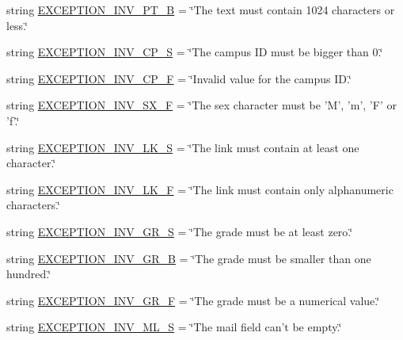 \begin{DoxyCompactItemize}
\item 
string \hyperlink{namespaceELO_1_1lang_1_1en__us_a7b395973b5cd7ee9115746fb78e90832}{E\-X\-C\-E\-P\-T\-I\-O\-N\-\_\-\-I\-N\-V\-\_\-\-P\-T\-\_\-\-B} = \char`\"{}The text must contain 1024 characters or less.\char`\"{}
\item 
string \hyperlink{namespaceELO_1_1lang_1_1en__us_a9f3bc4edb7cf8b2a8a8e69dba7107c89}{E\-X\-C\-E\-P\-T\-I\-O\-N\-\_\-\-I\-N\-V\-\_\-\-C\-P\-\_\-\-S} = \char`\"{}The campus I\-D must be bigger than 0.\char`\"{}
\item 
string \hyperlink{namespaceELO_1_1lang_1_1en__us_afefa8b55d7fbe71a4763059b598e6274}{E\-X\-C\-E\-P\-T\-I\-O\-N\-\_\-\-I\-N\-V\-\_\-\-C\-P\-\_\-\-F} = \char`\"{}Invalid value for the campus I\-D.\char`\"{}
\item 
string \hyperlink{namespaceELO_1_1lang_1_1en__us_a5e7c07eb4437cdc43592aeb52133497f}{E\-X\-C\-E\-P\-T\-I\-O\-N\-\_\-\-I\-N\-V\-\_\-\-S\-X\-\_\-\-F} = \char`\"{}The sex character must be 'M', 'm', 'F' or 'f'.\char`\"{}
\item 
string \hyperlink{namespaceELO_1_1lang_1_1en__us_a00dd434b73828d998899c7646396b73a}{E\-X\-C\-E\-P\-T\-I\-O\-N\-\_\-\-I\-N\-V\-\_\-\-L\-K\-\_\-\-S} = \char`\"{}The link must contain at least one character.\char`\"{}
\item 
string \hyperlink{namespaceELO_1_1lang_1_1en__us_aeb6cf6a71c694ef5d886010823fdcdd5}{E\-X\-C\-E\-P\-T\-I\-O\-N\-\_\-\-I\-N\-V\-\_\-\-L\-K\-\_\-\-F} = \char`\"{}The link must contain only alphanumeric characters.\char`\"{}
\item 
string \hyperlink{namespaceELO_1_1lang_1_1en__us_af189f34fefed4347e3f9bd762cf93e95}{E\-X\-C\-E\-P\-T\-I\-O\-N\-\_\-\-I\-N\-V\-\_\-\-G\-R\-\_\-\-S} = \char`\"{}The grade must be at least zero.\char`\"{}
\item 
string \hyperlink{namespaceELO_1_1lang_1_1en__us_a7de1ff17377befff0bf0a9d7f723039e}{E\-X\-C\-E\-P\-T\-I\-O\-N\-\_\-\-I\-N\-V\-\_\-\-G\-R\-\_\-\-B} = \char`\"{}The grade must be smaller than one hundred.\char`\"{}
\item 
string \hyperlink{namespaceELO_1_1lang_1_1en__us_a865636282c5054ea2a0d9fa5fa09353a}{E\-X\-C\-E\-P\-T\-I\-O\-N\-\_\-\-I\-N\-V\-\_\-\-G\-R\-\_\-\-F} = \char`\"{}The grade must be a numerical value.\char`\"{}
\item 
string \hyperlink{namespaceELO_1_1lang_1_1en__us_a89a7b18195cfc844af362966f3b06b0d}{E\-X\-C\-E\-P\-T\-I\-O\-N\-\_\-\-I\-N\-V\-\_\-\-M\-L\-\_\-\-S} = \char`\"{}The mail field can't be empty.\char`\"{}
\item 

\end{DoxyCompactItemize}
